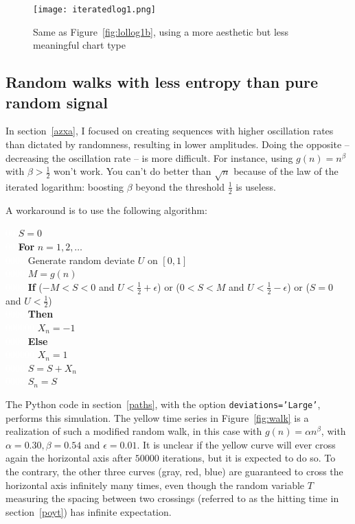 \documentclass[oneside,10pt]{book}
\begin{document}
\begin{figure}%
\centering
\texttt{[image: iteratedlog1.png]}
\caption{Same as Figure~\ref{fig:lollog1b}, using a more aesthetic but less meaningful chart type}
\label{fig:lollog1}
\end{figure}

\subsection{Random walks with less entropy than pure random signal}\label{azxb}

In section~\ref{azxa}, I focused on creating sequences with higher oscillation rates than dictated by randomness, resulting in lower amplitudes.
Doing the opposite -- decreasing the oscillation rate -- is more difficult. For instance, using $g(n)=n^\beta$ with $\beta>\frac{1}{2}$ won't work.
 You can't do better than $\sqrt{n}$ because of the law of the iterated logarithm: boosting $\beta$ beyond the threshold $\frac{1}{2}$  is
 useless.

\noindent A workaround is to use the following algorithm: \vspace{1ex}

\noindent\textcolor{white}{00} $S=0$ \\
\textcolor{white}{00} {\bf For} $n = 1, 2,\dots$\\
\textcolor{white}{0000}  Generate random deviate $U$ on $[0,1]$\\
\textcolor{white}{0000}  $M=g(n)$\\
\textcolor{white}{0000}  {\bf If} ($-M< S< 0$ and $U < \frac{1}{2}+\epsilon$)
or ($0<S< M$ and $U < \frac{1}{2}-\epsilon$) or ($S=0$ and $U<\frac{1}{2}$) \\
\textcolor{white}{0000} {\bf Then} \\
\textcolor{white}{000000} $X_n=-1$ \\
\textcolor{white}{0000} {\bf Else} \\
\textcolor{white}{000000} $X_n=1$\\
\textcolor{white}{0000} $S=S+X_n$\\
\textcolor{white}{0000} $S_n=S$ \vspace{1ex}

\noindent The Python code in section~\ref{paths}, with the option \texttt{deviations='Large'}, performs this simulation. The yellow time series in
 Figure~\ref{fig:walk} is a realization of such a modified random walk, in this case with $g(n)=\alpha n^\beta$, with
 $\alpha=0.30,\beta=0.54$ and $\epsilon=0.01$. It is unclear if the yellow curve will ever cross again the horizontal axis after
 $\num{50000}$ iterations, but it is expected to do so. To the contrary, the other three curves (gray, red, blue) are guaranteed to cross the
 horizontal axis infinitely many times, even though the random variable $T$ measuring the spacing between two crossings
 (referred to as the \textcolor{index}{hitting time} in section~\ref{poyt}) has infinite expectation.
\end{document}
